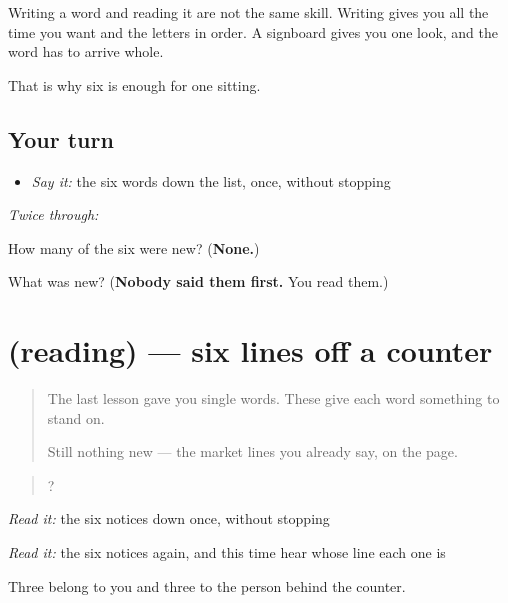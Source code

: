 Writing a word and reading it are not the same skill. Writing gives you all the time you want and the letters in order. A signboard gives you one look, and the word has to arrive whole.

That is why six is enough for one sitting.

\subsection*{Your turn}
\begin{itemize}
\raggedright
  \item \emph{Say it:} the six words down the list, once, without stopping
\end{itemize}

\emph{Twice through:}

\begin{tcolorbox}[breakable,colback=teal!4,colframe=teal!35!black,title={Before you move on}]
How many of the six were new? (\textbf{None.})

What was new? (\textbf{Nobody said them first.} You read them.)
\end{tcolorbox}
\section[(reading)]{(reading) — six lines off a counter}

\label{lesson:MW-C40-notices}



\begin{quote}
The last lesson gave you single words. These give each word something to stand on.

Still nothing new — the market lines you already say, on the page.
\end{quote}

\begin{tcolorbox}[breakable,skin=enhanced,colback=orange!6,colframe=orange!45!black,boxrule=0.5pt,arc=1mm,left=6pt,right=6pt,top=4pt,bottom=4pt,fonttitle=\bfseries,title={Read this}]
\begin{quote}
   ?            
\end{quote}

\emph{Read it:} the six notices down once, without stopping

\emph{Read it:} the six notices again, and this time hear whose line each one is

Three belong to you and three to the person behind the counter.
\end{tcolorbox}

